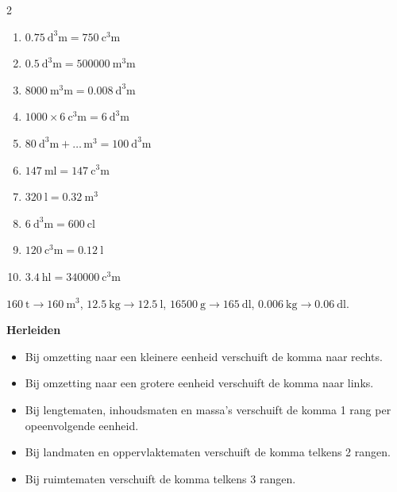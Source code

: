 \documentclass{bis}
\begin{document}
\begin{solution}
\begin{multicols}{2}
\begin{enumerate}
  \item \(\SI{0.75}{\cubic\deci\metre}=\SI{750}{\cubic\centi\metre}\)
  \item \(\SI{0.5}{\cubic\deci\metre}=\SI{500000}{\cubic\milli\metre}\)
  \item \(\SI{8000}{\cubic\milli\metre}=\SI{0.008}{\cubic\deci\metre}\)
  \item \(\num{1000}\times \SI{6}{\cubic\centi\metre}=\SI{6}{\cubic\deci\metre}\)
  \item \(\SI{80}{\cubic\deci\metre}+\ldots\,\si{\cubic\metre}=\SI{100}{\cubic\deci\metre}\)
  \item \(\SI{147}{\milli\litre}=\SI{147}{\cubic\centi\metre}\)
  \item \(\SI{320}{\litre}=\SI{0.32}{\cubic\metre}\)
  \item \(\SI{6}{\cubic\deci\metre}=\SI{600}{\centi\litre}\)
  \item \(\SI{120}{\cubic\centi\metre}=\SI{0.12}{\litre}\)
  \item \(\SI{3.4}{\hecto\litre}=\SI{340000}{\cubic\centi\metre}\)
\end{enumerate}
\end{multicols}
\(\SI{160}{\tonne}\to\SI{160}{\cubic\metre}\), \; \(\SI{12.5}{\kilo\gram}\to\SI{12.5}{\litre}\), \; \(\SI{16500}{\gram}\to\SI{165}{\deci\litre}\), \; \(\SI{0.006}{\kilo\gram}\to\SI{0.06}{\deci\litre}\).
\end{solution}

\oplossingen

\begin{onthoud}
\textbf{Herleiden}
\begin{itemize}
  \item Bij omzetting naar een kleinere eenheid verschuift de komma naar rechts.
  \item Bij omzetting naar een grotere eenheid verschuift de komma naar links.
  \item Bij lengtematen, inhoudsmaten en massa's verschuift de komma 1 rang per opeenvolgende eenheid.
  \item Bij landmaten en oppervlaktematen verschuift de komma telkens 2 rangen.
  \item Bij ruimtematen verschuift de komma telkens 3 rangen.
\end{itemize}
\end{onthoud}
\end{document}
